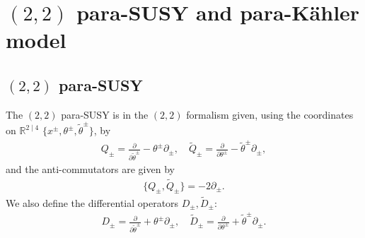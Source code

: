 \documentclass{article}
\newcommand{\RR}{\mathbb{R}}
\newcommand{\QQ}{\mathcal{Q}}
\newcommand{\p}{\partial}
\newcommand{\se}{\Gamma}
\newcommand{\tth}{\tl{\theta}}
\def\tl{\tilde}
\theoremstyle{definition}
\theoremstyle{definition}
\theoremstyle{remark}
\begin{document}
%



\section*{$(2,2)$ para-SUSY and para-K\"ahler model}

\subsection*{$(2,2)$ para-SUSY}
The $(2,2)$ para-SUSY is in the $(2,2)$ formalism given, using the coordinates on $\RR^{2\mid 4}$ $\{x^\pm,\theta^\pm,\tth^\pm\}$, by
\begin{align*}
Q_\pm=\frac{\p}{\p \tth^\pm}-\theta^\pm\p_\pm,\quad \tl{Q}_\pm=\frac{\p}{\p \theta^\pm}-\tth^\pm\p_\pm,
\end{align*}
and the anti-commutators are given by
\begin{align*}
\{Q_\pm,\tl{Q}_\pm\}=-2\p_\pm.
\end{align*}
We also define the differential operators $D_\pm,\tl{D}_\pm$:
\begin{align*}
D_\pm=\frac{\p}{\p \tth^\pm}+\theta^\pm\p_\pm,\quad \tl{D}_\pm=\frac{\p}{\p \theta^\pm}+\tth^\pm\p_\pm.
\end{align*}
\end{document}

